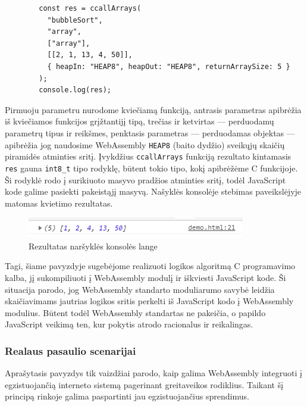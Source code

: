 \documentclass{VUMIFPSkursinis}
\begin{document}
\begin{center}
\begin{small}
\begin{verbatim}
        const res = ccallArrays(
          "bubbleSort",
          "array",
          ["array"],
          [[2, 1, 13, 4, 50]],
          { heapIn: "HEAP8", heapOut: "HEAP8", returnArraySize: 5 }
        );
        console.log(res);
\end{verbatim}
\end{small}
\end{center}

Pirmuoju parametru nurodome kviečiamą funkciją, antrasis parametras apibrėžia iš kviečiamos funkcijos grįžtantijį tipą, trečias ir ketvirtas — perduodamų parametrų tipus ir reikšmes, penktasis parametras — perduodamas objektas — apibrėžia jog naudosime WebAssembly \verb|HEAP8| (baito dydžio) sveikųjų skaičių piramidės atminties sritį. Įvykdžius \verb|ccallArrays| funkciją rezultato kintamasis \verb|res| gauna \verb|int8_t| tipo rodyklę, būtent tokio tipo, kokį apibrėžėme C funkcijoje. Ši rodyklė rodo į surikiuoto masyvo pradžios atminties sritį, todėl JavaScript kode galime pasiekti pakeistąjį masyvą. Našyklės konsolėje stebimas paveikslėjyje matomas kvietimo rezultatas.

\begin{figure}[h!]
  \begin{center}
  \includegraphics[scale=1]{sorted_array.png}
  \end{center}
  \caption{Rezultatas naršyklės konsolės lange}
  \label{fig:sorted_array}
\end{figure}

Tagi, šiame pavyzdyje sugebėjome realizuoti logikos algoritmą C programavimo kalba, jį sukompiliuoti į WebAssembly modulį ir iškviesti JavaScript kode. Ši situacija parodo, jog WebAssembly standarto moduliarumo savybė leidžia skaičiavimams jautrias logikos sritis perkelti iš JavaScript kodo į WebAssembly modulius. Būtent todėl WebAssembly standartas ne pakeičia, o papildo JavaScript veikimą ten, kur pokytis atrodo racionalus ir reikalingas.

\subsubsection{Realaus pasaulio scenarijai}

Aprašytasis pavyzdys tik vaizdžiai parodo, kaip galima WebAssembly integruoti į egzistuojančią interneto sistemą pagerinant greitaveikos rodiklius. Taikant šį principą rinkoje galima paspartinti jau egzistuojančius sprendimus.
\end{document}
